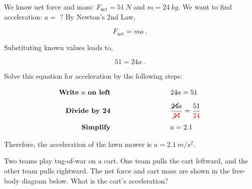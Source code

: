 \documentclass{article}
\numberwithin{equation}{section}
\numberwithin{figure}{section}
\begin{document}
\Solution We know net force and mass: $F_{\mathrm{net}} = \SI{51}{N}$ and $m = \SI{24}{kg}$. We want to find acceleration: $a =$ ? By Newton's 2nd Law,

\begin{equation*}
    F_{\mathrm{net}} = ma\ .
\end{equation*}

Substituting known values leads to,

\begin{equation*}
    51 = 24 a\ .
\end{equation*}

Solve this equation for acceleration by the following steps:

\begin{align*}
    \textbf{Write $a$ on left} \hspace{9cm} 
    & \hspace{-6cm} 24 a = 51\\[1ex]
    \textbf{Divide by 24} \hspace{9cm}
    & \hspace{-6cm} \frac{\cancel{24}a}{\textcolor{red}{\cancel{24}}} = \frac{51}{\textcolor{red}{24}}\\[1ex]
    \textbf{Simplify} \hspace{9cm}
    & \hspace{-6cm} a = 2.1
\end{align*}

Therefore, the acceleration of the lawn mower is  $a = \SI{2.1}{m/s^2}$.

\clearpage

\begin{example} \label{ex:TugOWar} 
Two teams play tug-of-war on a cart. One team pulls the cart leftward, and the other team pulls rightward. The net force and cart mass are shown in the free-body diagram below. What is the cart's acceleration?
\end{example}

\begin{figure}[h!]
    \centering
{}
\end{figure}
\end{document}

